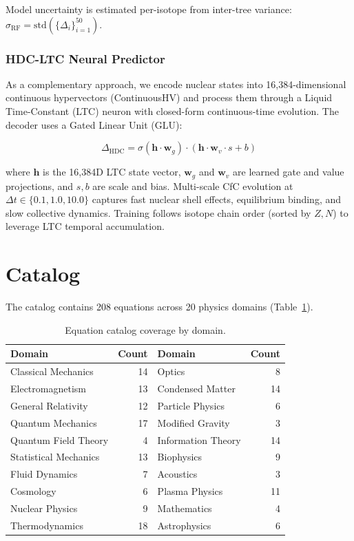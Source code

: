 \documentclass[letterpaper,11pt]{article}
\begin{document}
Model uncertainty is estimated per-isotope from inter-tree variance:
$\sigma_{\text{RF}} = \text{std}(\{\Delta_i\}_{i=1}^{50})$.

\subsubsection{HDC-LTC Neural Predictor}

As a complementary approach, we encode nuclear states into 16,384-dimensional
continuous hypervectors (ContinuousHV) and process them through a Liquid
Time-Constant (LTC) neuron with closed-form continuous-time evolution. The
decoder uses a Gated Linear Unit (GLU):

\begin{equation}
\Delta_{\text{HDC}} = \sigma(\mathbf{h} \cdot \mathbf{w}_g) \cdot (\mathbf{h} \cdot \mathbf{w}_v \cdot s + b)
\end{equation}

where $\mathbf{h}$ is the 16,384D LTC state vector, $\mathbf{w}_g$ and
$\mathbf{w}_v$ are learned gate and value projections, and $s, b$ are scale and
bias. Multi-scale CfC evolution at $\Delta t \in \{0.1, 1.0, 10.0\}$ captures
fast nuclear shell effects, equilibrium binding, and slow collective dynamics.
Training follows isotope chain order (sorted by $Z, N$) to leverage LTC temporal
accumulation.

\section{Catalog}

The catalog contains 208 equations across 20 physics domains (Table~\ref{tab:domains}).

\begin{table}[h]
\centering
\caption{Equation catalog coverage by domain.}
\label{tab:domains}
\begin{tabular}{lr|lr}
\toprule
Domain & Count & Domain & Count \\
\midrule
Classical Mechanics & 14 & Optics & 8 \\
Electromagnetism & 13 & Condensed Matter & 14 \\
General Relativity & 12 & Particle Physics & 6 \\
Quantum Mechanics & 17 & Modified Gravity & 3 \\
Quantum Field Theory & 4 & Information Theory & 14 \\
Statistical Mechanics & 13 & Biophysics & 9 \\
Fluid Dynamics & 7 & Acoustics & 3 \\
Cosmology & 6 & Plasma Physics & 11 \\
Nuclear Physics & 9 & Mathematics & 4 \\
Thermodynamics & 18 & Astrophysics & 6 \\
\bottomrule
\end{tabular}
\end{table}
\end{document}
